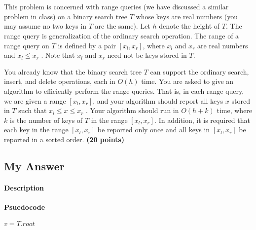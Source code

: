 \documentclass{article}
\begin{document}
\section{}

 This problem is concerned with range queries (we have discussed a
 similar problem in class) on a binary search tree $T$ whose keys are
 real numbers (you may assume no two keys in $T$ are the same). Let
 $h$ denote the height of $T$. The range query is generalization of
 the ordinary search operation. The range of a range query on $T$ is
 defined by a pair $[x_l ,x_r ]$, where $x_l$ and $x_r$ are real
 numbers and $x_l \le x_r$ . Note that $x_l$ and $x_r$ need not be
 keys stored in $T$. 

You already know that the binary search tree $T$ can support the
ordinary search, insert, and delete operations, each in $O(h)$
time. You are asked to give an algorithm to efficiently perform the
range queries. That is, in each range query, we are given a range
$[x_l ,x_r ]$, and your algorithm should report all keys $x$ stored in
$T$ such that $x_l \le x \le x_r$ . Your algorithm should run in $O(h
+ k)$ time, where $k$ is the number of keys of $T$ in the range $[x_l
,x_r ]$. In addition, it is required that each key in the range $[x_l
,x_r ]$ be reported only once and all keys in $[x_l ,x_r ]$ be
reported in a sorted order. {\bf (20 points)}

\subsection{My Answer}

\paragraph{Description}

\paragraph{Psuedocode}


{\singlespacing
\begin{algorithmic}
  \State $v = T.root$
  \State {}
\EndFunction
\end{algorithmic}
\begin{algorithmic}
  \EndIf
    \State {}
  \EndIf

    \State {}
  \EndIf

    \State {}
  \EndIf
\EndProcedure
\end{algorithmic}
}
\end{document}

